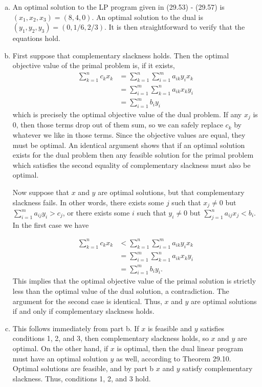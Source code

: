 \documentclass{article}
\begin{document}
\begin{enumerate}[a.]
\item  An optimal solution to the LP program given in (29.53) - (29.57) is $(x_1,x_2,x_3) = (8,4,0)$.  An optimal solution to the dual is $(y_1,y_2,y_3) = (0,1/6,2/3)$. It is then straightforward to verify that the equations hold. 

\item First suppose that complementary slackness holds.  Then the optimal objective value of the primal problem is, if it exists,
\begin{align*}
\sum_{k=1}^n c_kx_k &= \sum_{k=1}^n \sum_{i=1}^m a_{ik}y_i x_k \\
&= \sum_{i=1}^m\sum_{k=1}^na_{ik}x_k y_i \\
&= \sum_{i=1}^m b_iy_i
\end{align*}
which is precisely the optimal objective value of the dual problem.  If any $x_j$ is 0, then those terms drop out of them sum, so we can safely replace $c_k$ by whatever we like in those terms.  Since the objective values are equal, they must be optimal.  An identical argument shows that if an optimal solution exists for the dual problem then any feasible solution for the primal problem which satisfies the second equality of complementary slackness must also be optimal.  

Now suppose that $x$ and $y$ are optimal solutions, but that complementary slackness fails.  In other words, there exists some $j$ such that $x_j \neq 0$ but $\sum_{i=1}^m a_{ij}y_i > c_j$, or there exists some $i$ such that $y_i \neq 0$ but $\sum_{j=1}^n a_{ij}x_j < b_i$.  In the first case we have

\begin{align*}
\sum_{k=1}^n c_kx_k &< \sum_{k=1}^n \sum_{i=1}^m a_{ik}y_i x_k \\
&= \sum_{i=1}^m\sum_{k=1}^na_{ik}x_k y_i \\
&= \sum_{i=1}^m b_iy_i.
\end{align*}
This implies that the optimal objective value of the primal solution is strictly less than the optimal value of the dual solution, a contradiction.  The argument for the second case is identical.  Thus, $x$ and $y$ are optimal solutions if and only if complementary slackness holds. 

\item This follows immediately from part b.  If $x$ is feasible and $y$ satisfies conditions 1, 2, and 3, then complementary slackness holds, so $x$ and $y$ are optimal.  On the other hand, if $x$ is optimal, then the dual linear program must have an optimal solution $y$ as well, according to Theorem 29.10.  Optimal solutions are feasible, and by part b $x$ and $y$ satisfy complementary slackness. Thus, conditions 1, 2, and 3 hold. 
\end{enumerate}
\end{document}
